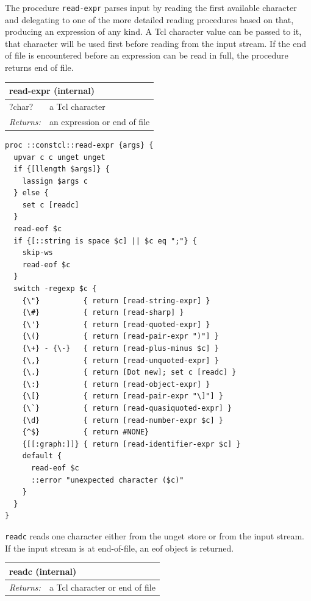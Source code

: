 \documentclass[twoside,9pt]{report}
\begin{document}
The procedure \texttt{read-expr} parses input by reading the first available character and delegating to one of the more detailed reading procedures based on that, producing an expression of any kind. A Tcl character value can be passed to it, that character will be used first before reading from the input stream. If the end of file is encountered before an expression can be read in full, the procedure returns end of file.

\begin{tabular}{ |l l| }
\hline
\multicolumn{2}{|l|}{read-expr (internal)} \\
\hline
?char? & a Tcl character \\
\textit{Returns:} & an expression or end of file \\
\hline
\end{tabular}

\noindent\makebox[\linewidth]{\rule{\linewidth}{0.4pt}}
\begin{lstlisting}
proc ::constcl::read-expr {args} {
  upvar c c unget unget
  if {[llength $args]} {
    lassign $args c
  } else {
    set c [readc]
  }
  read-eof $c
  if {[::string is space $c] || $c eq ";"} {
    skip-ws
    read-eof $c
  }
  switch -regexp $c {
    {\"}          { return [read-string-expr] }
    {\#}          { return [read-sharp] }
    {\'}          { return [read-quoted-expr] }
    {\(}          { return [read-pair-expr ")"] }
    {\+} - {\-}   { return [read-plus-minus $c] }
    {\,}          { return [read-unquoted-expr] }
    {\.}          { return [Dot new]; set c [readc] }
    {\:}          { return [read-object-expr] }
    {\[}          { return [read-pair-expr "\]"] }
    {\`}          { return [read-quasiquoted-expr] }
    {\d}          { return [read-number-expr $c] }
    {^$}          { return #NONE}
    {[[:graph:]]} { return [read-identifier-expr $c] }
    default {
      read-eof $c
      ::error "unexpected character ($c)"
    }
  }
}
\end{lstlisting}
\noindent\makebox[\linewidth]{\rule{\linewidth}{0.4pt}}

\texttt{readc} reads one character either from the unget store or from the input stream. If the input stream is at end-of-file, an eof object is returned.

\begin{tabular}{ |l l| }
\hline
\multicolumn{2}{|l|}{readc (internal)} \\
\hline
\textit{Returns:} & a Tcl character or end of file \\
\hline
\end{tabular}
\end{document}
